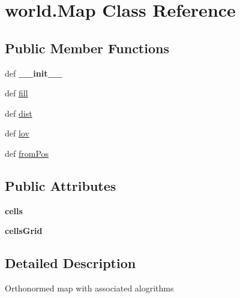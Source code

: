 \hypertarget{classworld_1_1_map}{\section{world.\-Map \-Class \-Reference}
\label{classworld_1_1_map}
}
\subsection*{\-Public \-Member \-Functions}
\begin{DoxyCompactItemize}
\item 
\hypertarget{classworld_1_1_map_aabfde95675f6b82d9a8afcd676053632}{def {\bfseries \-\_\-\-\_\-init\-\_\-\-\_\-}}\label{classworld_1_1_map_aabfde95675f6b82d9a8afcd676053632}

\item 
def \hyperlink{classworld_1_1_map_ac8e650b696f537d9df20ee5d2243e978}{fill}
\item 
def \hyperlink{classworld_1_1_map_ac5f255ae58db6b391d0a3d5807365370}{dist}
\item 
def \hyperlink{classworld_1_1_map_a7b1d3e4419fd5bd48d5f759e63ae55f5}{lov}
\item 
def \hyperlink{classworld_1_1_map_a12e89884cc3e9da4d024575a85b1d324}{from\-Pos}
\end{DoxyCompactItemize}
\subsection*{\-Public \-Attributes}
\begin{DoxyCompactItemize}
\item 
\hypertarget{classworld_1_1_map_af412cfb2a5b25f4ca3188498f916a647}{{\bfseries cells}}\label{classworld_1_1_map_af412cfb2a5b25f4ca3188498f916a647}

\item 
\hypertarget{classworld_1_1_map_aec6e18657e8d65b1ab57cdf305e2de37}{{\bfseries cells\-Grid}}\label{classworld_1_1_map_aec6e18657e8d65b1ab57cdf305e2de37}

\end{DoxyCompactItemize}


\subsection{\-Detailed \-Description}
\begin{DoxyVerb}Orthonormed map with associated alogrithms \end{DoxyVerb}
 


